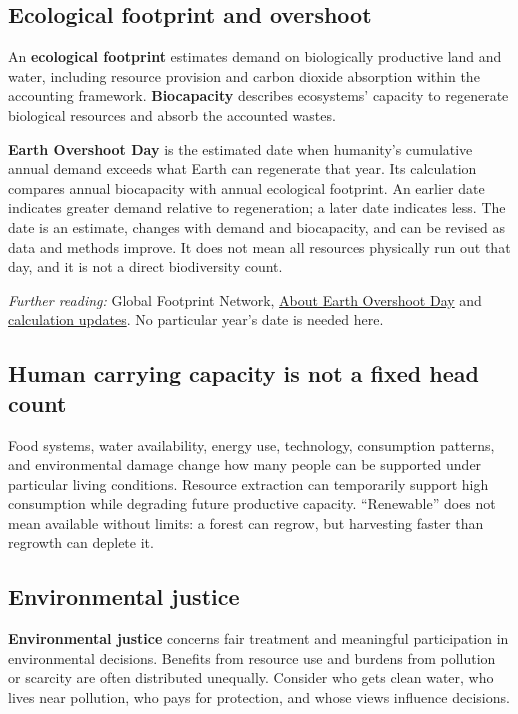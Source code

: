 \documentclass[11pt,letterpaper]{article}
\newcommand{\source}[1]{{\footnotesize\textit{Further reading:} #1\par}}
\begin{document}
\subsection*{Ecological footprint and overshoot}
An \textbf{ecological footprint} estimates demand on biologically productive land and water, including resource provision and carbon dioxide absorption within the accounting framework. \textbf{Biocapacity} describes ecosystems' capacity to regenerate biological resources and absorb the accounted wastes.

\textbf{Earth Overshoot Day} is the estimated date when humanity's cumulative annual demand exceeds what Earth can regenerate that year. Its calculation compares annual biocapacity with annual ecological footprint. An earlier date indicates greater demand relative to regeneration; a later date indicates less. The date is an estimate, changes with demand and biocapacity, and can be revised as data and methods improve. It does not mean all resources physically run out that day, and it is not a direct biodiversity count.
\source{Global Footprint Network, \href{https://overshoot.footprintnetwork.org/about-earth-overshoot-day/}{About Earth Overshoot Day} and \href{https://footprintnetwork.org/our-work/earth-overshoot-day/}{calculation updates}. No particular year's date is needed here.}
\subsection*{Human carrying capacity is not a fixed head count}
Food systems, water availability, energy use, technology, consumption patterns, and environmental damage change how many people can be supported under particular living conditions. Resource extraction can temporarily support high consumption while degrading future productive capacity. ``Renewable'' does not mean available without limits: a forest can regrow, but harvesting faster than regrowth can deplete it.
\subsection*{Environmental justice}
\textbf{Environmental justice} concerns fair treatment and meaningful participation in environmental decisions. Benefits from resource use and burdens from pollution or scarcity are often distributed unequally. Consider who gets clean water, who lives near pollution, who pays for protection, and whose views influence decisions.
\end{document}
